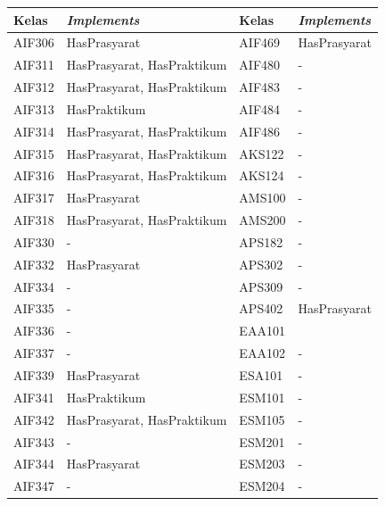 \begin{enumerate}
\begin{table}[H]
	\centering
    \begin{tabular}{|p{2.125cm}|p{4.9cm}|p{2.125cm}|p{4.9cm}|}
		\hline
		Kelas & \textit{Implements} & Kelas & \textit{Implements}\\
		\hline
    AIF306  & HasPrasyarat               &    AIF469  & HasPrasyarat \\
    AIF311  & HasPrasyarat, HasPraktikum &    AIF480  & -                          \\
    AIF312  & HasPrasyarat, HasPraktikum &    AIF483  & -                          \\
    AIF313  & HasPraktikum               &    AIF484  & -                          \\
    AIF314  & HasPrasyarat, HasPraktikum &    AIF486  & -                          \\
    AIF315  & HasPrasyarat, HasPraktikum &    AKS122  & -                          \\
		AIF316  & HasPrasyarat, HasPraktikum &    AKS124  & -         		\\
    AIF317  & HasPrasyarat               &    AMS100  & -         		\\
    AIF318  & HasPrasyarat, HasPraktikum &    AMS200  & -         		\\
    AIF330  & -                          &    APS182  & -          		\\
    AIF332  & HasPrasyarat               &    APS302  & -         		\\
    AIF334  & -                          &    APS309  & -         		\\
    AIF335  & -                          &    APS402  & HasPrasyarat	\\
    AIF336  & -                          &    EAA101  &           		\\
    AIF337  & -                          &  EAA102    & -           	\\
    AIF339  & HasPrasyarat               &  ESA101    & -         		\\
    AIF341  & HasPraktikum               &  ESM101    & -         		\\
    AIF342  & HasPrasyarat, HasPraktikum &  ESM105    & -			 \\
    AIF343  & -                          &  ESM201    & -            \\
    AIF344  & HasPrasyarat               & 	ESM203    & -				\\
    AIF347  & -                          & 	ESM204    & -				\\

\end{tabular}
\end{table}
\end{enumerate}

